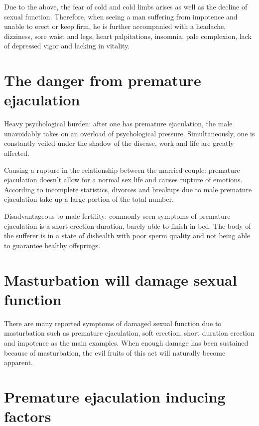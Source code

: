 \documentclass[
]{book}
\begin{document}
Due to the above, the fear of cold and cold limbs arises as well as the decline of sexual function. Therefore, when seeing a man suffering from impotence and unable to erect or keep firm, he is further accompanied with a headache, dizziness, sore waist and legs, heart palpitations, insomnia, pale complexion, lack of depressed vigor and lacking in vitality.

\hypertarget{the-danger-from-premature-ejaculation}{%
\section{The danger from premature ejaculation}\label{the-danger-from-premature-ejaculation}}

Heavy psychological burden: after one has premature ejaculation, the male unavoidably takes on an overload of psychological pressure. Simultaneously, one is constantly veiled under the shadow of the disease, work and life are greatly affected.

Causing a rupture in the relationship between the married couple: premature ejaculation doesn't allow for a normal sex life and causes rupture of emotions. According to incomplete statistics, divorces and breakups due to male premature ejaculation take up a large portion of the total number.

Disadvantageous to male fertility: commonly seen symptoms of premature ejaculation is a short erection duration, barely able to finish in bed. The body of the sufferer is in a state of dishealth with poor sperm quality and not being able to guarantee healthy offsprings.

\hypertarget{masturbation-will-damage-sexual-function}{%
\section{Masturbation will damage sexual function}\label{masturbation-will-damage-sexual-function}}

There are many reported symptoms of damaged sexual function due to masturbation such as premature ejaculation, soft erection, short duration erection and impotence as the main examples. When enough damage has been sustained because of masturbation, the evil fruits of this act will naturally become apparent.

\hypertarget{premature-ejaculation-inducing-factors}{%
\section{Premature ejaculation inducing factors}\label{premature-ejaculation-inducing-factors}}
\end{document}
